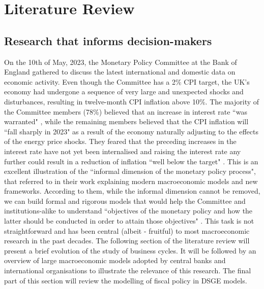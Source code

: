 \section{Literature Review}

\subsection{Research that informs decision-makers}
On the 10th of May, 2023, the Monetary Policy Committee at the Bank of England gathered to discuss the latest international and domestic data on economic activity. Even though the Committee has a 2\% CPI target, the UK's economy had undergone a sequence of very large and unexpected shocks and disturbances, resulting in twelve-month CPI inflation above 10\%. The majority of the Committee members (78\%) believed that an increase in interest rate ``was warranted" \parencite[4]{boe_2023_monetary}, while the remaining members believed that the CPI inflation will ``fall sharply in 2023" \parencite[5]{boe_2023_monetary} as a result of the economy naturally adjusting to the effects of the energy price shocks. They feared that the preceding increases in the interest rate have not yet been internalised and raising the interest rate any further could result in a reduction of inflation ``well below the target" \parencite[5]{boe_2023_monetary}. This is an excellent illustration of the ``informal dimension of the monetary policy process", that \parencite[26]{gals_2007_macroeconomic} referred to in their work explaining modern macroeconomic models and new frameworks. According to them, while the informal dimension cannot be removed, we can build formal and rigorous models that would help the Committee and institutions-alike to understand ``objectives of the monetary policy and how the latter should be conducted in order to attain those objectives" \parencite[2]{jordigal_2015_monetary}. This task is not straightforward and has been central (albeit - fruitful) to most macroeconomic research in the past decades. The following section of the literature review will present a brief evolution of the study of business cycles. It will be followed by an overview of large macroeconomic models adopted by central banks and international organisations to illustrate the relevance of this research. The final part of this section will review the modelling of fiscal policy in DSGE models.

